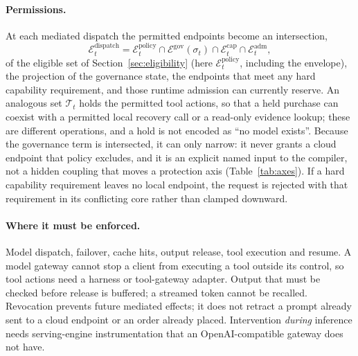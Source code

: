 \documentclass[11pt]{article}
\newcommand{\E}{\mathcal{E}}
\begin{document}
\paragraph{Permissions.} At each mediated dispatch the permitted endpoints become an
intersection,
\begin{equation}
  \E_t^{\mathrm{dispatch}} = \E_t^{\mathrm{policy}} \cap \E^{\mathrm{gov}}(\sigma_t) \cap
  \E_t^{\mathrm{cap}} \cap \E_t^{\mathrm{adm}},
  \label{eq:smartdispatch}
\end{equation}
of the eligible set of Section~\ref{sec:eligibility} (here $\E_t^{\mathrm{policy}}$, including
the envelope), the projection of the governance state, the endpoints that meet any hard
capability requirement, and those runtime admission can currently reserve. An analogous set
$\mathcal{T}_t$ holds the permitted tool actions, so that a held purchase can coexist with a
permitted local recovery call or a read-only evidence lookup; these are different operations,
and a hold is not encoded as ``no model exists''. Because the governance term is intersected,
it can only narrow: it never grants a cloud endpoint that policy excludes, and it is an explicit
named input to the compiler, not a hidden coupling that moves a protection axis
(Table~\ref{tab:axes}). If a hard capability requirement leaves no local endpoint, the request
is rejected with that requirement in its conflicting core rather than clamped downward.

\paragraph{Where it must be enforced.} Model dispatch, failover, cache hits, output release,
tool execution and resume. A model gateway cannot stop a client from executing a tool outside
its control, so tool actions need a harness or tool-gateway adapter. Output that must be checked
before release is buffered; a streamed token cannot be recalled. Revocation prevents future
mediated effects; it does not retract a prompt already sent to a cloud endpoint or an order
already placed. Intervention \emph{during} inference needs serving-engine instrumentation that
an OpenAI-compatible gateway does not have.
\end{document}
